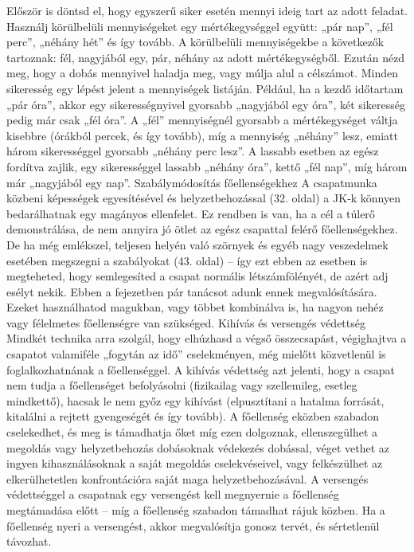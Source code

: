 \documentclass[oneside]{book}
\begin{document}
Először is döntsd el, hogy egyszerű siker esetén mennyi ideig tart az adott feladat. Használj körülbelüli mennyiségeket egy mértékegységgel együtt: „pár nap”, „fél perc”, „néhány hét” és így tovább. A körülbelüli mennyiségekbe a következők tartoznak: fél, nagyjából egy, pár, néhány az adott mértékegységből.
Ezután nézd meg, hogy a dobás mennyivel haladja meg, vagy múlja alul a célszámot. Minden sikeresség egy lépést jelent a mennyiségek listáján.
Például, ha a kezdő időtartam „pár óra”, akkor egy sikerességnyivel gyorsabb „nagyjából egy óra”, két sikeresség pedig már csak „fél óra”. A „fél” mennyiségnél gyorsabb a mértékegységet váltja kisebbre (órákból percek, és így tovább), míg a mennyiség „néhány” lesz, emiatt három sikerességgel gyorsabb „néhány perc lesz”.
A lassabb esetben az egész fordítva zajlik, egy sikerességgel lassabb „néhány óra”, kettő „fél nap”, míg három már „nagyjából egy nap”.
Szabálymódosítás főellenségekhez
A csapatmunka közbeni képességek egyesítésével és helyzetbehozással (32. oldal) a JK‑k könnyen bedarálhatnak egy magányos ellenfelet. Ez rendben is van, ha a cél a túlerő demonstrálása, de nem annyira jó ötlet az egész csapattal felérő főellenségekhez.
De ha még emlékszel, teljesen helyén való szörnyek és egyéb nagy veszedelmek esetében megszegni a szabályokat (43. oldal) – így ezt ebben az esetben is megteheted, hogy semlegesíted a csapat normális létszámfölényét, de azért adj esélyt nekik. Ebben a fejezetben pár tanácsot adunk ennek megvalósítására. Ezeket használhatod magukban, vagy többet kombinálva is, ha nagyon nehéz vagy félelmetes főellenségre van szükséged.
Kihívás és versengés védettség
Mindkét technika arra szolgál, hogy elhúzhasd a végső összecsapást, végighajtva a csapatot valamiféle „fogytán az idő” cselekményen, még mielőtt közvetlenül is foglalkozhatnának a főellenséggel.
A kihívás védettség azt jelenti, hogy a csapat nem tudja a főellenséget befolyásolni (fizikailag vagy szellemileg, esetleg mindkettő), hacsak le nem győz egy kihívást (elpusztítani a hatalma forrását, kitalálni a rejtett gyengeségét és így tovább). A főellenség eközben szabadon cselekedhet, és meg is támadhatja őket míg ezen dolgoznak, ellenszegülhet a megoldás vagy helyzetbehozás dobásoknak védekezés dobással, véget vethet az ingyen kihasználásoknak a saját megoldás cselekvéseivel, vagy felkészülhet az elkerülhetetlen konfrontációra saját maga helyzetbehozásával.
A versengés védettséggel a csapatnak egy versengést kell megnyernie a főellenség megtámadása előtt – míg a főellenség szabadon támadhat rájuk közben. Ha a főellenség nyeri a versengést, akkor megvalósítja gonosz tervét, és sértetlenül távozhat.
\end{document}
